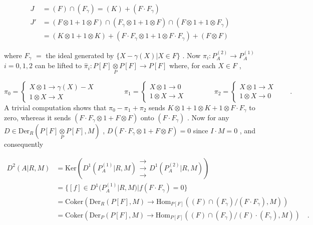 
 
\begin{align*}
J &= (F) \cap (F_\gamma) = (K) + (F\cdot F_\gamma)\\
J' &= (F\otimes 1 + 1\otimes F) \cap (F_\gamma\otimes 1 + 1\otimes F) \cap (F\otimes 1 + 1\otimes F_\gamma)\\
&= (K\otimes 1 + 1\otimes K) + (F\cdot F_\gamma\otimes 1 + 1\otimes F\cdot F_\gamma) + (F\otimes F)
\end{align*}

where  $F_\gamma$ $=$ the ideal generated by  $\{X - \gamma(X)|X \in F\}$  . Now  $\pi_i : P_A^{(2)} \to P_A^{(1)}$  $i = 0, 1, 2$  can be lifted to  $\hat{\pi}_i : P[F]\underset{P}{\otimes}P[F] \to P[F]$  where, for each  $X \in F$  ,

$$\pi_0 = \begin{cases} X\otimes 1 \to \gamma(X) - X\\[3ex] 1\otimes X \to X\end{cases}\qquad\qquad \pi_1 = \begin{cases} X\otimes 1 \to 0\\[3ex] 1\otimes X \to X\end{cases}\qquad\qquad \pi_2 = \begin{cases} X\otimes 1 \to X\\[3ex] 1\otimes X \to 0\end{cases}\qquad .$$
A trivial computation shows that  $\pi_0 - \pi_1 + \pi_2$  sends  $K\otimes 1 + 1\otimes K + 1\otimes F\cdot F_\gamma$  to zero, whereas it sends  $(F\cdot F_\gamma\otimes 1 + F\otimes F)$  onto  $(F\cdot F_\gamma)$  . Now for any $D \in \mathrm{Der}_R(P[F]\underset{P}{\otimes}P[F], M)$  ,  $D(F\cdot F_\gamma\otimes 1 + F\otimes F) = 0$  since  $I\cdot M = 0$  , and consequently

\begin{align*}
D^2(A|R, M) &= \mathrm{Ker}(D^1(P_A^{(1)}|R, M) \mathrel{\substack{\to\\ \to\\ \to}} D^1(P_A^{(2)}|R, M))\\
&= \{[f] \in D^1(P_A^{(1)}|R, M)|f(F\cdot F_\gamma) = 0\}\\
&= \mathrm{Coker}(\mathrm{Der}_R(P[F], M) \to \mathrm{Hom}_{P[F]}((F) \cap (F_\gamma)/(F\cdot F_\gamma), M))\\
&= \mathrm{Coker}(\mathrm{Der}_P(P[F], M) \to \mathrm{Hom}_{P[F]}((F) \cap (F_\gamma)/(F)\cdot(F_\gamma), M))\quad .
\end{align*}

